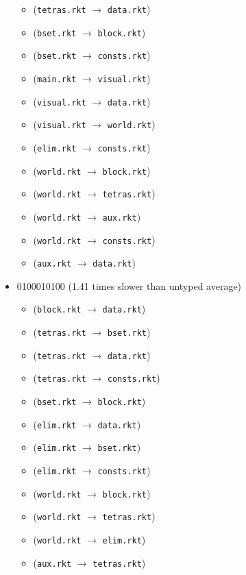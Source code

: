\documentclass{article}
\newcommand{\mono}[1]{\texttt{#1}}
\begin{document}
\begin{itemize}
\begin{itemize}
  \item (\mono{tetras.rkt} $\rightarrow$ \mono{data.rkt})
  \item (\mono{bset.rkt} $\rightarrow$ \mono{block.rkt})
  \item (\mono{bset.rkt} $\rightarrow$ \mono{consts.rkt})
  \item (\mono{main.rkt} $\rightarrow$ \mono{visual.rkt})
  \item (\mono{visual.rkt} $\rightarrow$ \mono{data.rkt})
  \item (\mono{visual.rkt} $\rightarrow$ \mono{world.rkt})
  \item (\mono{elim.rkt} $\rightarrow$ \mono{consts.rkt})
  \item (\mono{world.rkt} $\rightarrow$ \mono{block.rkt})
  \item (\mono{world.rkt} $\rightarrow$ \mono{tetras.rkt})
  \item (\mono{world.rkt} $\rightarrow$ \mono{aux.rkt})
  \item (\mono{world.rkt} $\rightarrow$ \mono{consts.rkt})
  \item (\mono{aux.rkt} $\rightarrow$ \mono{data.rkt})
  \end{itemize}
\item 0100010100 (1.41 times slower than untyped average)
  \begin{itemize}
  \item (\mono{block.rkt} $\rightarrow$ \mono{data.rkt})
  \item (\mono{tetras.rkt} $\rightarrow$ \mono{bset.rkt})
  \item (\mono{tetras.rkt} $\rightarrow$ \mono{data.rkt})
  \item (\mono{tetras.rkt} $\rightarrow$ \mono{consts.rkt})
  \item (\mono{bset.rkt} $\rightarrow$ \mono{block.rkt})
  \item (\mono{elim.rkt} $\rightarrow$ \mono{data.rkt})
  \item (\mono{elim.rkt} $\rightarrow$ \mono{bset.rkt})
  \item (\mono{elim.rkt} $\rightarrow$ \mono{consts.rkt})
  \item (\mono{world.rkt} $\rightarrow$ \mono{block.rkt})
  \item (\mono{world.rkt} $\rightarrow$ \mono{tetras.rkt})
  \item (\mono{world.rkt} $\rightarrow$ \mono{elim.rkt})
  \item (\mono{aux.rkt} $\rightarrow$ \mono{tetras.rkt})
  \end{itemize}

\end{itemize}
\end{document}
